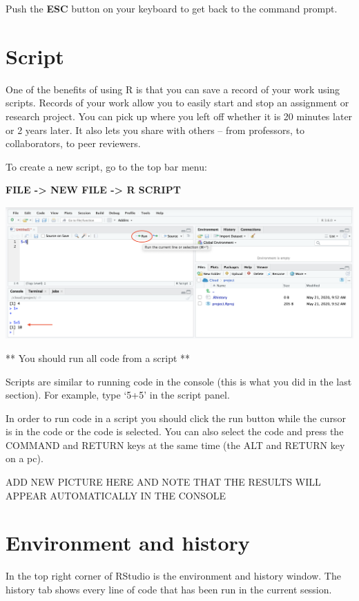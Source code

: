 \documentclass[]{book}
\begin{document}
Push the \textbf{ESC} button on your keyboard to get back to the command prompt.

\hypertarget{script}{%
\section{Script}\label{script}}

One of the benefits of using R is that you can save a record of your work using scripts. Records of your work allow you to easily start and stop an assignment or research project. You can pick up where you left off whether it is 20 minutes later or 2 years later. It also lets you share with others -- from professors, to collaborators, to peer reviewers.

To create a new script, go to the top bar menu:

\textbf{FILE -\textgreater{} NEW FILE -\textgreater{} R SCRIPT}

\includegraphics{img/script.png}

** You should run all code from a script **

Scripts are similar to running code in the console (this is what you did in the last section). For example, type `5+5' in the script panel.

In order to run code in a script you should click the run button while the cursor is in the code or the code is selected. You can also select the code and press the COMMAND and RETURN keys at the same time (the ALT and RETURN key on a pc).

ADD NEW PICTURE HERE AND NOTE THAT THE RESULTS WILL APPEAR AUTOMATICALLY IN THE CONSOLE

\hypertarget{environment-and-history}{%
\section{Environment and history}\label{environment-and-history}}

In the top right corner of RStudio is the environment and history window. The history tab shows every line of code that has been run in the current session.
\end{document}
